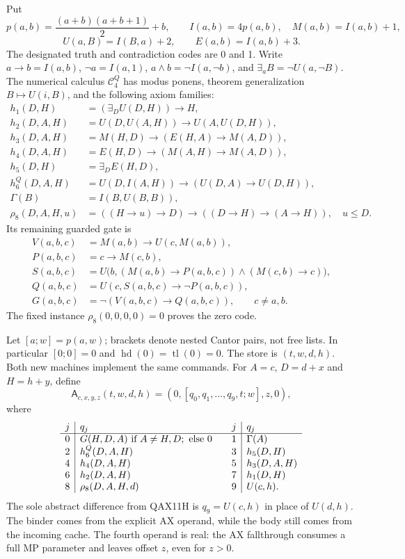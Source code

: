 Put
\[
 p(a,b)=\frac{(a+b)(a+b+1)}2+b,\qquad
 I(a,b)=4p(a,b),\quad M(a,b)=I(a,b)+1,
\]
\[
 U(a,B)=I(B,a)+2,\qquad E(a,b)=I(a,b)+3.
\]
The designated truth and contradiction codes are 0 and 1.  Write
$a\to b=I(a,b)$, $\neg a=I(a,1)$,
$a\wedge b=\neg I(a,\neg b)$, and
$\exists_a B=\neg U(a,\neg B)$.  The numerical calculus
$\mathcal C_4^Q$ has modus ponens, theorem generalization
$B\mapsto U(i,B)$, and the following axiom families:
\begin{align*}
 h_1(D,H)&=(\exists_D U(D,H))\to H,\\
 h_2(D,A,H)&=U(D,U(A,H))\to U(A,U(D,H)),\\
 h_3(D,A,H)&=M(H,D)\to(E(H,A)\to M(A,D)),\\
 h_4(D,A,H)&=E(H,D)\to(M(A,H)\to M(A,D)),\\
 h_5(D,H)&=\exists_D E(H,D),\\
 h_6^Q(D,A,H)&=U(D,I(A,H))\to(U(D,A)\to U(D,H)),\\
 \Gamma(B)&=I(B,U(B,B)),\\
 \rho_8(D,A,H,u)&=((H\to u)\to D)\to((D\to H)\to(A\to H)),
 \quad u\le D.
\end{align*}
Its remaining guarded gate is
\begin{align*}
 V(a,b,c)&=M(a,b)\to U(c,M(a,b)),\\
 P(a,b,c)&=c\to M(c,b),\\
 S(a,b,c)&=U\bigl(b,(M(a,b)\to P(a,b,c))\wedge(M(c,b)\to c)\bigr),\\
 Q(a,b,c)&=U(c,S(a,b,c)\to\neg P(a,b,c)),\\
 G(a,b,c)&=\neg(V(a,b,c)\to Q(a,b,c)),\qquad c\ne a,b.
\end{align*}
The fixed instance $\rho_8(0,0,0,0)=0$ proves the zero code.

Let $[a;w]=p(a,w)$; brackets denote nested Cantor pairs, not free lists.
In particular $[0;0]=0$ and $\operatorname{hd}(0)=\operatorname{tl}(0)=0$.
The store is $(t,w,d,h)$.  Both new machines implement the same commands.
For $A=c$, $D=d+x$ and $H=h+y$, define
\[
 \mathsf A_{c,x,y,z}(t,w,d,h)
       =(0,[q_0,q_1,\ldots,q_9,t;w],z,0),                 \tag{G-A}
\]
where
\[
\begin{array}{c|l@{\qquad}c|l}
 j&q_j&j&q_j\\\hline
 0&G(H,D,A)\text{ if }A\ne H,D;\text{ else }0
     &1&\Gamma(A)\\
 2&h_6^Q(D,A,H)&3&h_5(D,H)\\
 4&h_4(D,A,H)&5&h_3(D,A,H)\\
 6&h_2(D,A,H)&7&h_1(D,H)\\
 8&\rho_8(D,A,H,d)&9&U(c,h).
\end{array}
\]
The sole abstract difference from QAX11H is $q_9=U(c,h)$ in place
of $U(d,h)$.  The binder comes from the explicit AX operand, while
the body still comes from the incoming cache.  The fourth operand is
real: the AX fallthrough consumes a full MP parameter and leaves offset
$z$, even for $z>0$.

